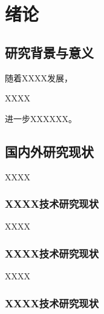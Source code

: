 %
%

\chapter{绪论}\label{chap1}

\section{研究背景与意义}
随着XXXX\cite{aciiccmez2010new}发展，

XXXX

进一步XXXXXX。

\section{国内外研究现状}
XXXX
\subsection{XXXX技术研究现状}
XXXX
\subsection{XXXX技术研究现状}
XXXX
\subsection{XXXX技术研究现状}

